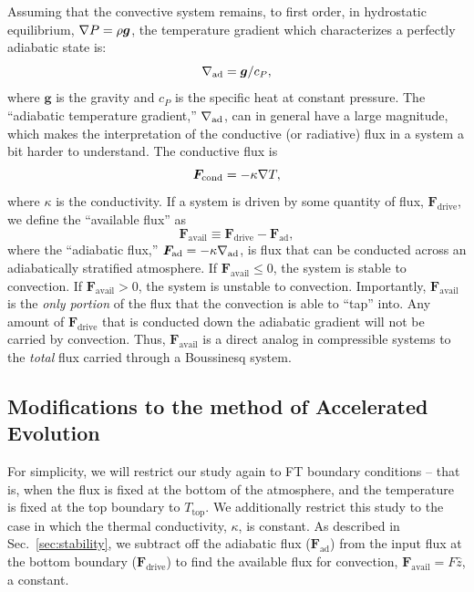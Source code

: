 Assuming that the convective system remains, to first order, in hydrostatic equilibrium, $\nabla P = \rho \bm{g}$, the temperature gradient which characterizes a perfectly adiabatic state is:
\begin{equation}
\nabla_{\text{ad}} = \bm{g}/c_P,
\end{equation}
where $\bm{g}$ is the gravity and $c_P$ is the specific heat at constant pressure.
The ``adiabatic temperature gradient,'' $\nabla_{\text{ad}}$, can in general have a large magnitude, which makes the interpretation of the conductive (or radiative) flux in a system a bit harder to understand.
The conductive flux is
\begin{equation}
\bm{F}_{\text{cond}} = -\kappa \nabla T,
\end{equation}
where $\kappa$ is the conductivity.
If a system is driven by some quantity of flux, $\bm{F}_{\text{drive}}$, we define the ``available flux'' as
\begin{equation}
\bm{F}_{\text{avail}} \equiv \bm{F}_{\text{drive}} - \bm{F}_{\text{ad}},
\end{equation}
where the ``adiabatic flux,'' $\bm{F}_{\text{ad}} = -\kappa\nabla_{\text{ad}}$, is flux that can be conducted across an adiabatically stratified atmosphere.
If $\bm{F}_{\text{avail}} \leq 0$, the system is stable to convection.
If $\bm{F}_{\text{avail}} > 0$, the system is unstable to convection.
Importantly, $\bm{F}_{\text{avail}}$ is the \emph{only portion} of the flux that the convection is able to ``tap'' into.
Any amount of $\bm{F}_{\text{drive}}$ that is conducted down the adiabatic gradient will not be carried by convection.
Thus, $\bm{F}_{\text{avail}}$ is a direct analog in compressible systems to the \emph{total} flux carried through a Boussinesq system.




\subsection{Modifications to the method of Accelerated Evolution}
\label{sec:ae}
For simplicity, we will restrict our study again to FT boundary conditions -- that is, when the flux is fixed at the bottom of the atmosphere, and the temperature is fixed at the top boundary to $T_{\text{top}}$.
We additionally restrict this study to the case in which the thermal conductivity, $\kappa$, is constant.
As described in Sec.~\ref{sec:stability}, we subtract off the adiabatic flux ($\bm{F}_{\text{ad}}$) from the input flux at the bottom boundary ($\bm{F}_{\text{drive}}$) to find the available flux for convection, $\bm{F}_{\text{avail}} = F \hat{z}$, a constant.

